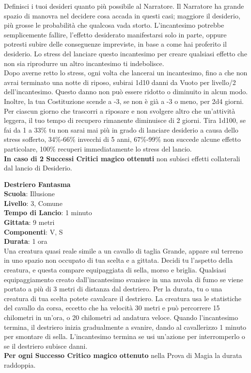 \begin{multicols}{2}
\medskip
Definisci i tuoi desideri quanto più possibile al Narratore. Il Narratore ha grande spazio di manovra nel decidere cosa accada in questi casi; maggiore il desiderio, più grosse le probabilità che qualcosa vada storto. L'incantesimo potrebbe semplicemente fallire, l'effetto desiderato manifestarsi solo in parte, oppure potresti subire delle conseguenze impreviste, in base a come hai proferito il desiderio. Lo stress del lanciare questo incantesimo per creare qualsiasi effetto che non sia riprodurre un altro incantesimo ti indebolisce.\\
Dopo averne retto lo stress, ogni volta che lancerai un incantesimo, fino a che non avrai terminato una notte di riposo, subirai 1d10 danni da Vuoto per livello/2 dell'incantesimo. Questo danno non può essere ridotto o diminuito in alcun modo. Inoltre, la tua Costituzione scende a -3, se non è già a -3 o meno, per 2d4 giorni.\\
Per ciascun giorno che trascorri a riposare e non svolgere altro che un'attività leggera, il tuo tempo di recupero rimanente diminuisce di 2 giorni.
Tira 1d100, se fai da 1 a 33\% tu non sarai mai più in grado di lanciare desiderio a causa dello stress sofferto, 34\%-66\% invecchi di 5 anni, 67\%-99\% non succede alcune effetto particolare, 100\% recuperi immediatamente lo stress del lancio.\\
\textbf{In caso di 2 Successi Critici magico ottenuti} non subisci effetti collaterali dal lancio di Desiderio.

\medskip\textbf{Destriero Fantasma}\\
\textbf{Scuola}: Illusione\\
\textbf{Livello}: 3, Comune\\
\textbf{Tempo di Lancio}: 1 minuto\\
\textbf{Gittata}: 9 metri\\
\textbf{Componenti}: V, S\\
\textbf{Durata}: 1 ora\\
Una creatura quasi reale simile a un cavallo di taglia Grande, appare sul terreno in uno spazio non occupato di tua scelta e a gittata. Decidi tu l'aspetto della creatura, e questa compare equipaggiata di sella, morso e briglia. Qualsiasi equipaggiamento creato dall'incantesimo svanisce in una nuvola di fumo se viene portato a più di 3 metri di distanza dal destriero. Per la durata, tu o una creatura di tua scelta potete cavalcare il destriero. La creatura usa le statistiche del cavallo da corsa, eccetto che ha velocità 30 metri e può percorrere 15 chilometri in un'ora, o 20 chilometri ad andatura veloce. Quando l'incantesimo termina, il destriero inizia gradualmente a svanire, dando al cavallerizzo 1 minuto per smontare di sella. L'incantesimo termina se usi un'azione per interromperlo o se il destriero subisce danni.\\
\textbf{Per ogni Successo Critico magico ottenuto} nella Prova di Magia la durata raddoppia.


\end{multicols}
